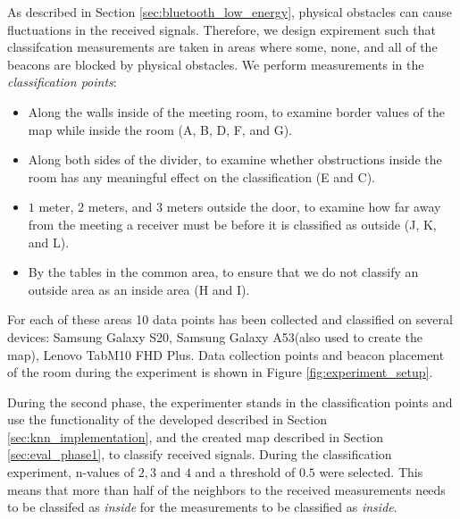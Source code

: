 As described in Section \ref{sec:bluetooth_low_energy}, physical obstacles can cause fluctuations in the received signals. 
Therefore, we design expirement such that classifcation measurements are taken in areas where some, none, and all of the beacons are blocked by physical obstacles. 
We perform measurements in the \textit{classification points}:
\begin{itemize}
    \item Along the walls inside of the meeting room, to examine border values of the map while inside the room (A, B, D, F, and G).
    \item Along both sides of the divider, to examine whether obstructions inside the room has any meaningful effect on the classification (E and C).
    \item $1$ meter, $2$ meters, and $3$ meters outside the door, to examine how far away from the meeting a receiver must be before it is classified as outside (J, K, and L).
    \item By the tables in the common area, to ensure that we do not classify an outside area as an inside area (H and I).
\end{itemize}
For each of these areas 10 data points has been collected and classified on several devices: Samsung Galaxy S20, Samsung Galaxy A53(also used to create the map), Lenovo TabM10 FHD Plus.
Data collection points and beacon placement of the room during the experiment is shown in Figure \ref{fig:experiment_setup}. 

During the second phase, the experimenter stands in the classification points and use the functionality of the developed described in Section \ref{sec:knn_implementation}, and the created map described in Section \ref{sec:eval_phase1}, to classify received signals. 
During the classification experiment, n-values of $2,3$ and $4$ and a threshold of $0.5$ were selected. 
This means that more than half of the neighbors to the received measurements needs to be classifed as \textit{inside} for the measurements to be classified as \textit{inside}.
